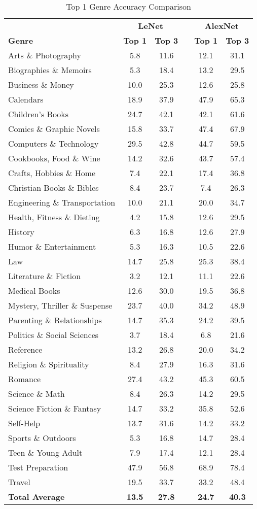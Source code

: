 \documentclass[conference]{IEEEtran}
\begin{document}
\begin{table}
\caption{Top 1 Genre Accuracy Comparison}
\label{genacc}
\centering
\begin{tabular}{lccccc}
\hline
& \multicolumn{2}{c}{\textbf{LeNet}} & & \multicolumn{2}{c}{\textbf{AlexNet}} \\
\cmidrule{2-3} 
\cmidrule{5-6} 
\textbf{Genre} & \textbf{Top 1} & \textbf{Top 3} & & \textbf{Top 1} & \textbf{Top 3} \\
\hline
Arts \& Photography&5.8 & 11.6 &&12.1&31.1\\Biographies \& Memoirs&5.3&18.4 &&13.2&29.5\\Business \& Money&10.0&25.3&&12.6&25.8\\Calendars&18.9&37.9&&47.9&65.3\\Children's Books&24.7&42.1&&42.1&61.6\\Comics \& Graphic Novels&15.8&33.7&&47.4&67.9\\Computers \& Technology&29.5&42.8&&44.7&59.5\\Cookbooks, Food \& Wine&14.2&32.6&&43.7&57.4\\Crafts, Hobbies \& Home&7.4&22.1&&17.4&36.8\\Christian Books \& Bibles&8.4&23.7&&7.4&26.3\\Engineering \& Transportation&10.0&21.1&&20.0&34.7\\Health, Fitness \& Dieting&4.2&15.8&&12.6&29.5\\History&6.3&16.8&&12.6&27.9\\Humor \& Entertainment&5.3&16.3&&10.5&22.6\\Law&14.7&25.8&&25.3&38.4\\Literature \& Fiction&3.2&12.1&&11.1&22.6\\Medical Books&12.6&30.0&&19.5&36.8\\Mystery, Thriller \& Suspense&23.7&40.0&&34.2&48.9\\Parenting \& Relationships&14.7&35.3&&24.2&39.5\\Politics \& Social Sciences&3.7&18.4&&6.8&21.6\\Reference&13.2&26.8&&20.0&34.2\\Religion \& Spirituality&8.4&27.9&&16.3&31.6\\Romance&27.4&43.2&&45.3&60.5\\Science \& Math&8.4&26.3&&14.2&29.5\\Science Fiction \& Fantasy&14.7&33.2&&35.8&52.6\\Self-Help&13.7&31.6&&14.2&33.2\\Sports \& Outdoors&5.3&16.8&&14.7&28.4\\Teen \& Young Adult&7.9&17.4&&12.1&28.4\\Test Preparation&47.9&56.8&&68.9&78.4\\Travel&19.5&33.7&&33.2&48.4\\\textbf{Total Average} & \textbf{13.5}&\textbf{27.8}&& \textbf{24.7}&\textbf{40.3} \\
\hline
\end{tabular}
\end{table}
\end{document}
